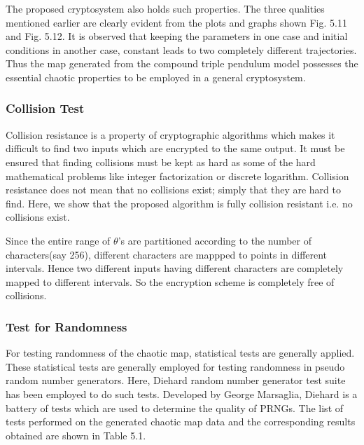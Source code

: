 The proposed cryptosystem also holds such properties. The three qualities mentioned earlier are clearly evident from the plots and graphs shown Fig. 5.11 and Fig. 5.12. It is observed that keeping the parameters in one case and initial conditions in another case, constant leads to two completely different trajectories. Thus the map generated from the compound triple pendulum model possesses the essential chaotic properties to be employed in a general cryptosystem. 

\subsubsection{Collision Test}
Collision resistance is a property of cryptographic algorithms which makes it difficult to find two inputs which are encrypted to the same output. It must be ensured that finding collisions must be kept as hard as some of the hard mathematical problems like integer factorization  or discrete logarithm. Collision resistance does not mean that no collisions exist; simply that they are hard to find. Here, we show that the proposed algorithm is fully collision resistant i.e. no collisions exist.

Since the entire range of $\theta$'s are partitioned according to the number of characters(say 256), different characters are mappped to points in different intervals. Hence two different inputs having different characters are completely mapped to different intervals. So the encryption scheme is completely free of collisions. 

\subsubsection{Test for Randomness}
For testing randomness of the chaotic map, statistical tests are generally applied. These statistical tests are generally employed for testing randomness in pseudo random number generators. Here, Diehard random number generator test suite has been employed to do such tests. Developed by George Marsaglia, Diehard is a battery of tests which are used to determine the quality of PRNGs. The list of tests performed on the generated chaotic map data and the corresponding results obtained are shown in Table 5.1.

